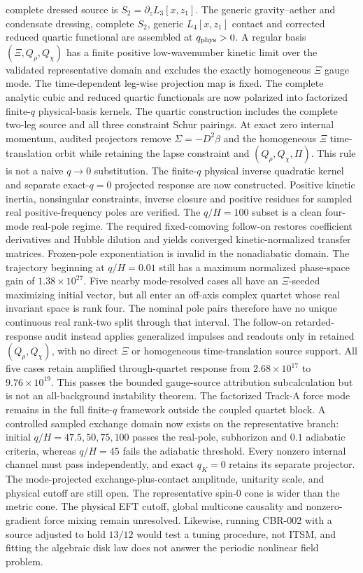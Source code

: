 complete dressed source is $S_2=\partial_zL_3[x,z_1]$.  The generic
gravity--aether and condensate dressing, complete $S_2$, generic
$L_4[x,z_1]$ contact and corrected reduced quartic functional are assembled
at $q_{\rm phys}>0$.  A regular basis $(\Xi,Q_\rho,Q_\chi)$ has a finite
positive low-wavenumber kinetic limit over the validated representative
domain and excludes the exactly homogeneous $\Xi$ gauge mode.  The
time-dependent leg-wise projection map is fixed.  The complete analytic cubic
and reduced quartic functionals are now polarized into factorized finite-$q$
physical-basis kernels.  The quartic construction
includes the complete two-leg source and all three constraint Schur pairings.
At exact zero internal momentum, audited projectors remove
$\Sigma=-D^2\beta$ and the homogeneous $\Xi$ time-translation orbit while
retaining the lapse constraint and $(Q_\rho,Q_\chi,\Pi)$.  This rule is not a
naive $q\to0$ substitution.  The finite-$q$ physical inverse quadratic kernel
and separate exact-$q=0$ projected response are now constructed.  Positive
kinetic inertia, nonsingular constraints, inverse closure and positive
residues for sampled real positive-frequency poles are verified.  The
$q/H=100$ subset is a clean four-mode real-pole regime.  The required
fixed-comoving follow-on restores coefficient derivatives and Hubble dilution
and yields converged kinetic-normalized transfer matrices.  Frozen-pole
exponentiation is invalid in the nonadiabatic domain.  The trajectory beginning
at $q/H=0.01$ still has a maximum normalized phase-space gain of
$1.38\times10^{27}$.  Five nearby mode-resolved cases all have an
$\Xi$-seeded maximizing initial vector, but all enter an off-axis complex
quartet whose real invariant space is rank four.  The nominal pole pairs
therefore have no unique continuous real rank-two split through that interval.
The follow-on retarded-response audit instead applies generalized impulses and
readouts only in retained $(Q_\rho,Q_\chi)$, with no direct $\Xi$ or
homogeneous time-translation source support.  All five cases retain amplified
through-quartet response from $2.68\times10^{17}$ to
$9.76\times10^{19}$.  This passes the bounded gauge-source attribution
subcalculation but is not an all-background instability theorem.  The
factorized Track-A force mode remains in the full finite-$q$ framework outside
the coupled quartet block.  A controlled sampled exchange domain now exists
on the representative branch: initial $q/H=47.5,50,75,100$ passes the
real-pole, subhorizon and $0.1$ adiabatic criteria, whereas $q/H=45$ fails the
adiabatic threshold.  Every nonzero internal channel must pass independently,
and exact $q_K=0$ retains its separate projector.  The mode-projected
exchange-plus-contact amplitude, unitarity scale, and physical cutoff are
still open.  The
representative spin-0 cone is wider than the metric cone.
The physical EFT cutoff, global multicone causality
and nonzero-gradient force mixing remain unresolved.
Likewise, running CBR-002 with a source adjusted to hold $13/12$ would test a
tuning procedure, not ITSM, and fitting the algebraic disk law does not answer
the periodic nonlinear field problem.
